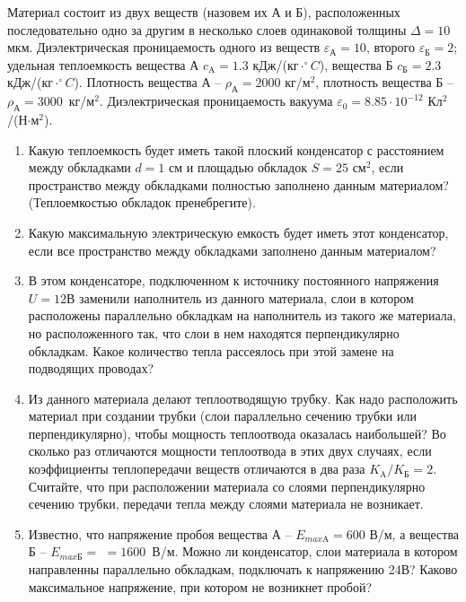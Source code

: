 
Материал состоит из двух веществ (назовем их А и Б), расположенных последовательно одно за другим в несколько слоев одинаковой толщины $\Delta = 10$ мкм. Диэлектрическая проницаемость одного из веществ $\varepsilon_\text{А} = 10$, второго $\varepsilon_\text{Б} = 2$; удельная теплоемкость вещества А $c_\text{A} = 1.3$ кДж/(кг$\cdot^{\circ}C$), вещества Б $c_\text{Б} = 2.3$ кДж/(кг$\cdot^{\circ}C$). Плотность вещества А – $\rho_\text{А} = 2000$ кг/м$^2$, плотность вещества Б – $\rho_\text{А} = 3000$~кг/м$^2$. Диэлектрическая проницаемость вакуума $\varepsilon_0 = 8.85\cdot10^{-12}$ Кл$^2$/(Н$\cdot$м$^2$).

\begin{enumerate}
    \item Какую теплоемкость будет иметь такой плоский конденсатор с расстоянием между обкладками $d = 1$ см и площадью обкладок $S = 25$ см$^2$, если пространство между обкладками полностью заполнено данным материалом? (Теплоемкостью обкладок пренебрегите).
    \item Какую максимальную электрическую емкость будет иметь этот конденсатор, если все пространство между обкладками заполнено данным материалом?
    \item В этом конденсаторе, подключенном к источнику постоянного напряжения $U = 12$В заменили наполнитель из данного материала, слои в котором расположены параллельно обкладкам на наполнитель из такого же материала, но расположенного так, что слои в нем находятся перпендикулярно обкладкам. Какое количество тепла рассеялось при этой замене на подводящих проводах? 
    \item Из данного материала делают теплоотводящую трубку. Как надо расположить материал при создании трубки (слои параллельно сечению трубки или перпендикулярно), чтобы мощность теплоотвода оказалась наибольшей? Во сколько раз отличаются мощности теплоотвода в этих двух случаях, если коэффициенты теплопередачи веществ отличаются в два раза $K_\text{A}/K_\text{Б} = 2$. Считайте, что при расположении материала со слоями перпендикулярно сечению трубки, передачи тепла между слоями материала не возникает.
    \item Известно, что напряжение пробоя вещества А – $E_{max\text{A}} = 600$ В/м, а вещества Б – $E_{max\text{Б}} =$ \linebreak $= 1600$~В/м.  Можно ли конденсатор, слои материала в котором направленны параллельно обкладкам, подключать к напряжению 24В? Каково максимальное напряжение, при котором не возникнет пробой?
\end{enumerate}